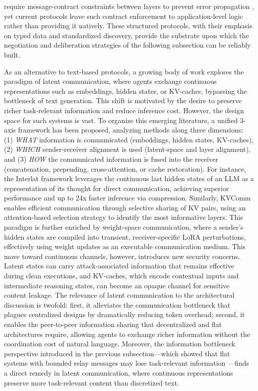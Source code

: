 \documentclass[11pt]{article}
\begin{document}
require message-contract constraints between layers to prevent error propagation \cite{ref56}, yet current protocols leave such contract enforcement to application-level logic rather than providing it natively. These structured protocols, with their emphasis on typed data and standardized discovery, provide the substrate upon which the negotiation and deliberation strategies of the following subsection can be reliably built.

As an alternative to text-based protocols, a growing body of work explores the paradigm of latent communication, where agents exchange continuous representations such as embeddings, hidden states, or KV-caches, bypassing the bottleneck of text generation. \cite{ref63} This shift is motivated by the desire to preserve richer task-relevant information and reduce inference cost. However, the design space for such systems is vast. To organize this emerging literature, a unified 3-axis framework has been proposed, analyzing methods along three dimensions: (1) \emph{WHAT} information is communicated (embeddings, hidden states, KV-caches), (2) \emph{WHICH} sender-receiver alignment is used (latent-space and layer alignment), and (3) \emph{HOW} the communicated information is fused into the receiver (concatenation, prepending, cross-attention, or cache restoration). \cite{ref63} For instance, the Interlat framework leverages the continuous last hidden states of an LLM as a representation of its thought for direct communication, achieving superior performance and up to 24x faster inference via compression. \cite{ref70} Similarly, KVComm enables efficient communication through selective sharing of KV pairs, using an attention-based selection strategy to identify the most informative layers. \cite{ref71} This paradigm is further enriched by weight-space communication, where a sender's hidden states are compiled into transient, receiver-specific LoRA perturbations, effectively using weight updates as an executable communication medium. \cite{ref72} This move toward continuous channels, however, introduces new security concerns. Latent states can carry attack-associated information that remains effective during clean executions, and KV-caches, which encode contextual inputs and intermediate reasoning states, can become an opaque channel for sensitive content leakage. \cite{ref73,ref74} The relevance of latent communication to the architectural discussion is twofold: first, it alleviates the communication bottleneck that plagues centralized designs by dramatically reducing token overhead; second, it enables the peer-to-peer information sharing that decentralized and flat architectures require, allowing agents to exchange richer information without the coordination cost of natural language. Moreover, the information bottleneck perspective introduced in the previous subsection---which showed that flat systems with bounded relay messages may lose task-relevant information \cite{ref58}---finds a direct remedy in latent communication, where continuous representations preserve more task-relevant content than discretized text.
\end{document}

